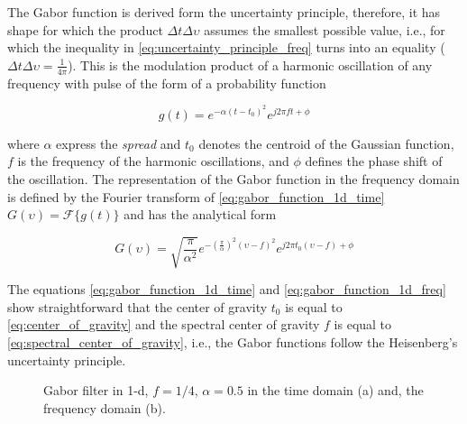 The Gabor function is derived form the uncertainty principle, therefore, it has shape for which the product $\Delta t \Delta \upsilon$ assumes the smallest possible value, i.e., for which the inequality in \eqref{eq:uncertainty_principle_freq} turns into an equality ($\Delta t \Delta \upsilon = \frac{1}{4 \pi}$). This is the modulation product of a harmonic oscillation of any frequency with pulse of the form of a probability function \cite{Gabor:JIEE:1946a}

\begin{equation}\label{eq:gabor_function_1d_time}
    g(t) =  e ^{-\alpha(t-t_0)^2} e ^{j 2 \pi f t + \phi}
\end{equation}

where $\alpha$ express the \textit{spread} and $t_0$ denotes the centroid of the Gaussian function, $f$ is the frequency of the harmonic oscillations, and $\phi$ defines the phase shift of the oscillation. The representation of the Gabor function in the frequency domain is defined by the Fourier transform of \eqref{eq:gabor_function_1d_time} $G(\upsilon) = \mathcal{F}\{g(t)\}$ and has the analytical form


\begin{equation}\label{eq:gabor_function_1d_freq}
    G(\upsilon) =  \sqrt{\frac{\pi}{\alpha^2}} e ^{-\left(\frac{\pi}{\alpha}\right) ^{2} (\upsilon-f)^2} e ^{j 2 \pi t_0 (\upsilon-f) + \phi}
\end{equation}

The equations \eqref{eq:gabor_function_1d_time} and \eqref{eq:gabor_function_1d_freq} show straightforward that the center of gravity $t_0$ is equal to \eqref{eq:center_of_gravity} and the spectral center of gravity $f$ is equal to \eqref{eq:spectral_center_of_gravity}, i.e., the Gabor functions follow the Heisenberg's uncertainty principle.  

\begin{figure}
	\centering
\caption{Gabor filter in 1-d, $f =1/4$, $\alpha=0.5$ in the time domain (a) and, the frequency domain (b).}\label{fig:Gabor_filter_time_freq}
\end{figure}

